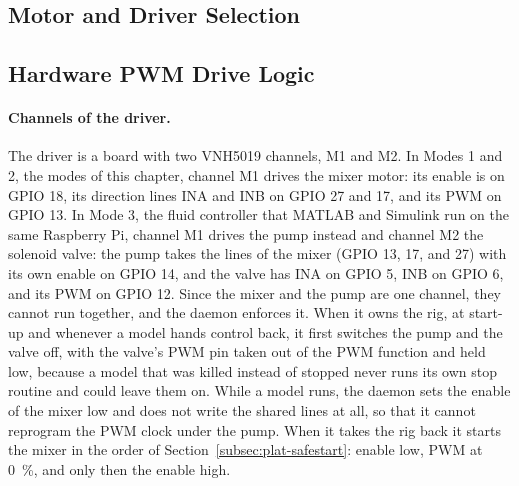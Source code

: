 \subsection{Motor and Driver Selection}
\label{subsec:agit-motor-sel}


\subsection{Hardware PWM Drive Logic}
\label{subsec:agit-pwm}

\paragraph{Channels of the driver.}
The driver is a board with two VNH5019 channels, M1 and M2. In Modes 1 and 2, the modes of this chapter, channel M1 drives the mixer motor: its enable is on GPIO 18, its direction lines INA and INB on GPIO 27 and 17, and its PWM on GPIO 13. In Mode 3, the fluid controller that MATLAB and Simulink run on the same Raspberry Pi, channel M1 drives the pump instead and channel M2 the solenoid valve: the pump takes the lines of the mixer (GPIO 13, 17, and 27) with its own enable on GPIO 14, and the valve has INA on GPIO 5, INB on GPIO 6, and its PWM on GPIO 12. Since the mixer and the pump are one channel, they cannot run together, and the daemon enforces it. When it owns the rig, at start-up and whenever a model hands control back, it first switches the pump and the valve off, with the valve's PWM pin taken out of the PWM function and held low, because a model that was killed instead of stopped never runs its own stop routine and could leave them on. While a model runs, the daemon sets the enable of the mixer low and does not write the shared lines at all, so that it cannot reprogram the PWM clock under the pump. When it takes the rig back it starts the mixer in the order of Section~\ref{subsec:plat-safestart}: enable low, PWM at 0~\%, and only then the enable high.

